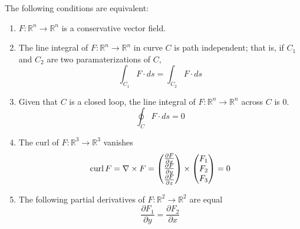   \begin{corollary}
  The following conditions are equivalent: 
  \begin{enumerate}
      \item $F: \mathbb{R}^n \longrightarrow \mathbb{R}^n$ is a conservative vector field. 
      \item The line integral of $F: \mathbb{R}^n \longrightarrow \mathbb{R}^n$ in curve $C$ is path independent; that is, if $C_1$ and $C_2$ are two paramaterizations of $C$, 
      \[\int_{C_1} F \cdot ds = \int_{C_2} F \cdot ds\]
      \item Given that $C$ is a closed loop, the line integral of $F: \mathbb{R}^n \longrightarrow \mathbb{R}^n$ across $C$ is $0$. 
      \[\oint_C F \cdot ds = 0\]
      \item The curl of $F: \mathbb{R}^3 \longrightarrow \mathbb{R}^3$ vanishes
      \[\operatorname{curl}{F} = \nabla \times F = \begin{pmatrix}
      \frac{\partial F}{\partial x} \\\frac{\partial F}{\partial y} \\\frac{\partial F}{\partial z} 
      \end{pmatrix} \times \begin{pmatrix}
      F_1\\F_2\\F_3
      \end{pmatrix}= 0\]
      \item The following partial derivatives of $F: \mathbb{R}^2 \longrightarrow \mathbb{R}^2$ are equal
      \[\frac{\partial F_1}{\partial y} = \frac{\partial F_2}{\partial x}\]
  \end{enumerate}
  \end{corollary}

